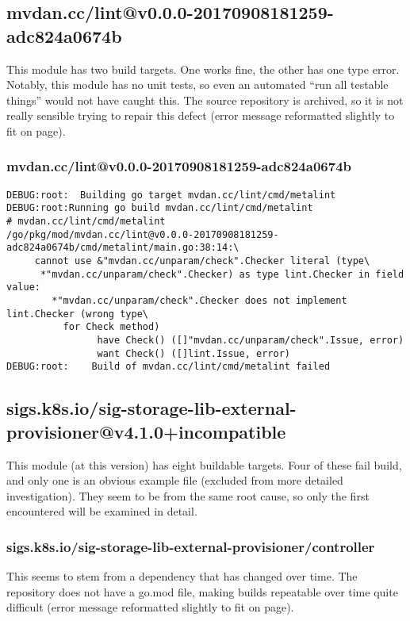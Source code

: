 \documentclass[a4paper]{paper}
\begin{document}
\subsection{mvdan.cc/lint@v0.0.0-20170908181259-adc824a0674b}

This module has two build targets. One works fine, the other has one
type error. Notably, this module has no unit tests, so even an
automated ``run all testable things'' would not have caught this. The
source repository is archived, so it is not really sensible trying to
repair this defect (error message reformatted slightly to fit on page).

\subsubsection{mvdan.cc/lint@v0.0.0-20170908181259-adc824a0674b}
\begin{verbatim}
DEBUG:root:  Building go target mvdan.cc/lint/cmd/metalint
DEBUG:root:Running go build mvdan.cc/lint/cmd/metalint
# mvdan.cc/lint/cmd/metalint
/go/pkg/mod/mvdan.cc/lint@v0.0.0-20170908181259-adc824a0674b/cmd/metalint/main.go:38:14:\
     cannot use &"mvdan.cc/unparam/check".Checker literal (type\
      *"mvdan.cc/unparam/check".Checker) as type lint.Checker in field value:
        *"mvdan.cc/unparam/check".Checker does not implement lint.Checker (wrong type\
          for Check method)
                have Check() ([]"mvdan.cc/unparam/check".Issue, error)
                want Check() ([]lint.Issue, error)
DEBUG:root:    Build of mvdan.cc/lint/cmd/metalint failed
\end{verbatim}

\subsection{sigs.k8s.io/sig-storage-lib-external-provisioner@v4.1.0+incompatible}

This module (at this version) has eight buildable targets. Four of
these fail build, and only one is an obvious example file (excluded
from more detailed investigation). They seem to be from the same root
cause, so only the first encountered will be examined in detail.

\subsubsection{sigs.k8s.io/sig-storage-lib-external-provisioner/controller}

This seems to stem from a dependency that has changed over time. The
repository does not have a go.mod file, making builds repeatable over
time quite difficult (error message reformatted slightly to fit on page).
\end{document}

